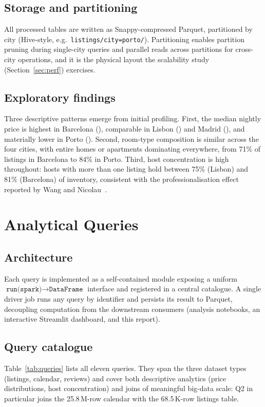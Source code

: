 \documentclass[conference]{IEEEtran}
\begin{document}
\subsection{Storage and partitioning}
All processed tables are written as Snappy-compressed Parquet, partitioned by city (Hive-style, e.g.\ \texttt{listings/city=porto/}). Partitioning enables partition pruning during single-city queries and parallel reads across partitions for cross-city operations, and it is the physical layout the scalability study (Section~\ref{sec:perf}) exercises.

\subsection{Exploratory findings}
Three descriptive patterns emerge from initial profiling. First, the median nightly price is highest in Barcelona (), comparable in Lisbon () and Madrid (), and materially lower in Porto (). Second, room-type composition is similar across the four cities, with entire homes or apartments dominating everywhere, from 71\% of listings in Barcelona to 84\% in Porto. Third, host concentration is high throughout: hosts with more than one listing hold between 75\% (Lisbon) and 81\% (Barcelona) of inventory, consistent with the professionalisation effect reported by Wang and Nicolau~\cite{wang2017price}.

\section{Analytical Queries}

\subsection{Architecture}
Each query is implemented as a self-contained module exposing a uniform \mbox{$\texttt{run(spark)} \to \texttt{DataFrame}$} interface and registered in a central catalogue. A single driver job runs any query by identifier and persists its result to Parquet, decoupling computation from the downstream consumers (analysis notebooks, an interactive Streamlit dashboard, and this report).

\subsection{Query catalogue}
Table~\ref{tab:queries} lists all eleven queries. They span the three dataset types (listings, calendar, reviews) and cover both descriptive analytics (price distributions, host concentration) and joins of meaningful big-data scale: Q2 in particular joins the 25.8\,M-row calendar with the 68.5\,K-row listings table.
\end{document}
